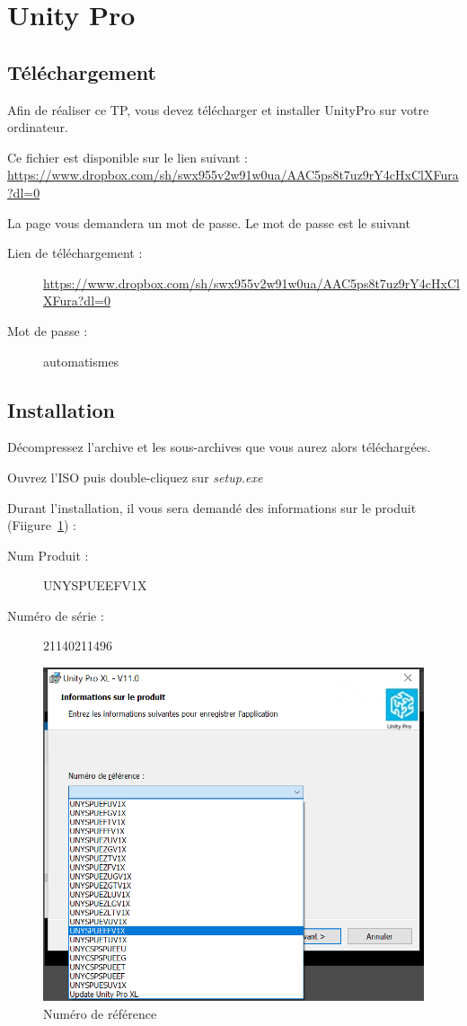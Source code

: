 \documentclass[11pt]{article}
\begin{document}
\UPSTIbuildPage


\section{Unity Pro}
\subsection{Téléchargement}
	Afin de réaliser ce TP, vous devez télécharger et installer UnityPro sur votre ordinateur.

	Ce fichier est disponible sur le lien suivant : \url{
https://www.dropbox.com/sh/swx955v2w91w0ua/AAC5ps8t7uz9rY4cHxClXFura?dl=0}

La page vous demandera un mot de passe. Le mot de passe est le suivant

\begin{description}
	\item [Lien de téléchargement : ] \url{
https://www.dropbox.com/sh/swx955v2w91w0ua/AAC5ps8t7uz9rY4cHxClXFura?dl=0}
	\item [Mot de passe : ] automatismes
\end{description}


\subsection{Installation}
Décompressez l'archive et les sous-archives que vous aurez alors téléchargées.

Ouvrez l'ISO puis double-cliquez sur \textit{setup.exe}

Durant l'installation, il vous sera demandé des informations sur le produit (Fiigure~\ref{fig:refNum}) :
\begin{description}
	\item [Num Produit : ]UNYSPUEEFV1X
	\item [Numéro de série : ] 21140211496
\end{description}

\begin{figure}[h!t]
\centering
	\includegraphics[width=.5\textwidth]{images/installationUnity/installNumProduit}
	\caption{Numéro de référence}
	\label{fig:refNum}
\end{figure}
\end{document}
